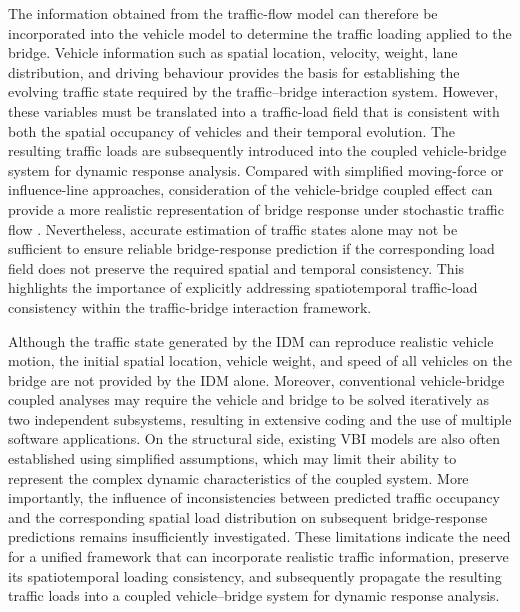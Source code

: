\documentclass[journal]{IEEEtran}
\begin{document}
The information obtained from the traffic-flow model can therefore be incorporated into the vehicle model to determine the traffic loading applied to the bridge. Vehicle information such as spatial location, velocity, weight, lane distribution, and driving behaviour provides the basis for establishing the evolving traffic state required by the traffic--bridge interaction system. However, these variables must be translated into a traffic-load field that is consistent with both the spatial occupancy of vehicles and their temporal evolution. The resulting traffic loads are subsequently introduced into the coupled vehicle-bridge system for dynamic response analysis. Compared with simplified moving-force or influence-line approaches, consideration of the vehicle-bridge coupled effect can provide a more realistic representation of bridge response under stochastic traffic flow \cite{yang2005,cantero2010}. Nevertheless, accurate estimation of traffic states alone may not be sufficient to ensure reliable bridge-response prediction if the corresponding load field does not preserve the required spatial and temporal consistency. This highlights the importance of explicitly addressing spatiotemporal traffic-load consistency within the traffic-bridge interaction framework.

Although the traffic state generated by the IDM can reproduce realistic vehicle motion, the initial spatial location, vehicle weight, and speed of all vehicles on the bridge are not provided by the IDM alone. Moreover, conventional vehicle-bridge coupled analyses may require the vehicle and bridge to be solved iteratively as two independent subsystems, resulting in extensive coding and the use of multiple software applications. On the structural side, existing VBI models are also often established using simplified assumptions, which may limit their ability to represent the complex dynamic characteristics of the coupled system. More importantly, the influence of inconsistencies between predicted traffic occupancy and the corresponding spatial load distribution on subsequent bridge-response predictions remains insufficiently investigated. These limitations indicate the need for a unified framework that can incorporate realistic traffic information, preserve its spatiotemporal loading consistency, and subsequently propagate the resulting traffic loads into a coupled vehicle--bridge system for dynamic response analysis.
\end{document}
